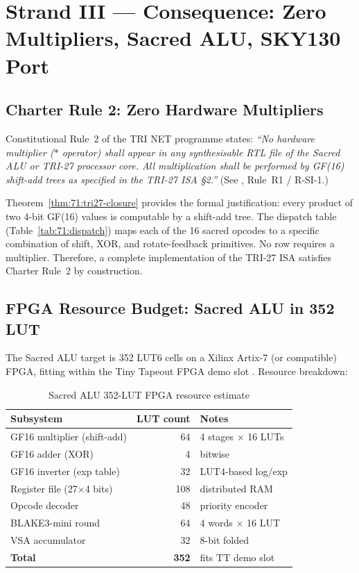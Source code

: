 \section{Strand III — Consequence: Zero Multipliers, Sacred ALU, SKY130 Port}
\label{sec:71:consequence}

\subsection{Charter Rule 2: Zero Hardware Multipliers}
\label{subsec:71:charter-rule2}

Constitutional Rule~2 of the TRI NET programme states:
\emph{``No hardware multiplier ($*$ operator) shall appear in any
synthesisable RTL file of the Sacred ALU or TRI-27 processor core.
All multiplication shall be performed by GF(16) shift-add trees
as specified in the TRI-27 ISA \S2.''} (See
, Rule~R1 / R-SI-1.)

Theorem~\ref{thm:71:tri27-closure} provides the formal justification:
every product of two 4-bit GF(16) values is computable by a
shift-add tree.  The dispatch table (Table~\ref{tab:71:dispatch})
maps each of the 16 sacred opcodes to a specific combination of
shift, XOR, and rotate-feedback primitives.  No row requires a
multiplier.  Therefore, a complete implementation of the TRI-27 ISA
satisfies Charter Rule~2 by construction.

\subsection{FPGA Resource Budget: Sacred ALU in 352 LUT}
\label{subsec:71:fpga-budget}

The Sacred ALU target is 352 LUT6 cells on a Xilinx Artix-7 (or
compatible) FPGA, fitting within the Tiny Tapeout FPGA demo slot
\cite{xilinx2022ultrascale}.  Resource breakdown:

\begin{table}[H]
\centering
\caption{Sacred ALU 352-LUT FPGA resource estimate}
\label{tab:71:fpga-resources}
\small
\begin{tabular}{lrl}
\toprule
Subsystem & LUT count & Notes \\
\midrule
GF16 multiplier (shift-add) & 64  & 4 stages × 16 LUTs \\
GF16 adder (XOR)            & 4   & bitwise \\
GF16 inverter (exp table)   & 32  & LUT4-based log/exp \\
Register file (27×4 bits)   & 108 & distributed RAM \\
Opcode decoder              & 48  & priority encoder \\
BLAKE3-mini round           & 64  & 4 words × 16 LUT \\
VSA accumulator             & 32  & 8-bit folded \\
\midrule
\textbf{Total}              & \textbf{352} & fits TT demo slot \\
\bottomrule
\end{tabular}
\end{table}

